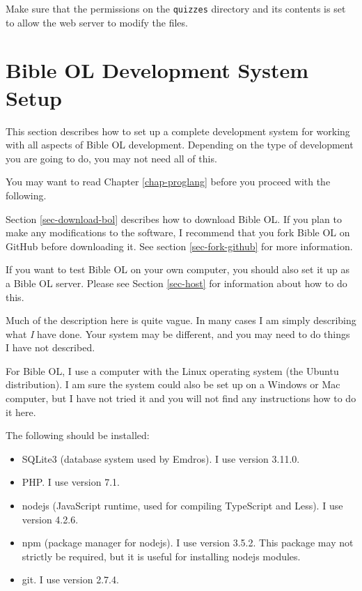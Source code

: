 \documentclass[11pt,oneside,a4paper]{memoir}
\begin{document}
Make sure that the permissions on the \texttt{quizzes} directory and its contents is set to allow
the web server to modify the files.

\section{Bible OL Development System Setup}\label{sec-devel}

This section describes how to set up a complete development system for working with all aspects of
Bible OL development. Depending on the type of development you are going to do, you may not need all
of this.

You may want to read Chapter \ref{chap-proglang} before you proceed with the following.

Section \ref{sec-download-bol} describes how to download Bible OL. If you plan to make any
modifications to the software, I recommend that you fork Bible OL on GitHub
before downloading it. See section \ref{sec-fork-github} for more information.

If you want to test Bible OL on your own computer, you should also set it up as a Bible OL server.
Please see Section \ref{sec-host} for information about how to do this.

Much of the description here is quite vague. In many cases I am simply describing what \emph{I} have
done. Your system may be different, and you may need to do things I have not described.

For Bible OL, I use a computer with the Linux operating system (the
Ubuntu distribution). I am sure the system could also be set up on a
Windows or Mac computer, but I have not tried it and you will not find any
instructions how to do it here.

The following should be installed:

\begin{itemize}
\item SQLite3 (database system used by Emdros). I use version 3.11.0.
\item PHP. I use version 7.1.
\item nodejs (JavaScript runtime, used for compiling TypeScript and Less). I use version
  4.2.6.
\item npm (package manager for nodejs). I use version 3.5.2.
  This package may not strictly be required, but it is useful for installing nodejs modules.
\item git. I use version 2.7.4.
\end{itemize}
\end{document}
